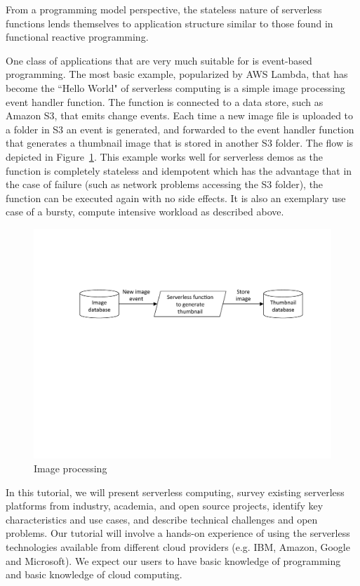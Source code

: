 \documentclass[conference]{IEEEtran}
\begin{document}
From a programming model perspective, the stateless nature of serverless functions lends themselves to application structure similar to those found in functional reactive programming.

One class of applications that are very much suitable for is event-based programming. The most basic example, popularized by AWS Lambda, that has become the ``Hello World" of serverless computing is a simple image processing event handler function. The function is connected to a data store, such as Amazon S3, that emits change events. Each time a new image file is
uploaded to a folder in S3 an event is generated, and forwarded to the event handler function that generates a thumbnail image that is stored in another S3 folder. The flow is depicted in
Figure~\ref{fig:UseCase-Thumbnail}. This example works well for serverless demos as the function is completely stateless and idempotent which has the advantage that in the case of failure (such as network problems accessing the S3 folder), the function can be executed again with no side effects. It is also an exemplary use case of a bursty, compute intensive workload as described above.

\begin{figure}[htp]
\includegraphics[width=\textwidth]{UseCase-Thumbnail2}
\caption{Image processing}
\label{fig:UseCase-Thumbnail}
\end{figure}


In this tutorial, we will present serverless computing, survey existing serverless platforms from industry, academia, and open source projects, identify key characteristics and use cases, and  describe technical challenges and open problems. Our tutorial will involve a hands-on experience of using the serverless technologies available from different cloud providers (e.g. IBM, Amazon, Google and Microsoft). We expect our users to have basic knowledge of programming and basic knowledge of cloud computing.
\end{document}
